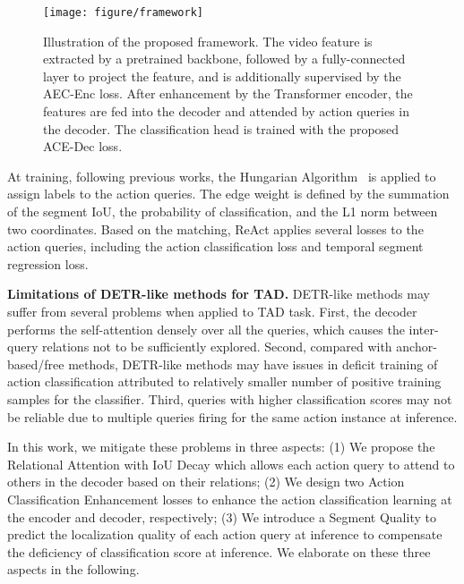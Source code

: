 \documentclass[runningheads]{llncs}
\newcommand{\myPara}[1]{\vspace{.05in}\noindent\textbf{#1}}
\def\name{ReAct }
\def\score{Segment Quality }
\begin{document}
\begin{figure}[t]
    \centering
    \setlength{\abovecaptionskip}{-0.2cm}
    \texttt{[image: figure/framework]}
    \label{framework}
    \caption{Illustration of the proposed framework. The video feature is extracted by a pretrained backbone, followed by a fully-connected layer to project the feature, and is additionally supervised by the AEC-Enc loss. After enhancement by the Transformer encoder, the features are fed into the decoder and attended by  action queries in the decoder. The classification head is trained with the proposed ACE-Dec loss.} 
    \vspace{-0.4cm}
\end{figure}




At training, following previous works\cite{carion2020end,zhu2020deformable,liu2021end}, the Hungarian Algorithm~\cite{kuhn1955hungarian} is applied to assign labels to the action queries. The edge weight is defined by the summation of the segment IoU, the probability of classification, and the L1 norm between two coordinates.
Based on the matching, \name applies several losses to the action queries, including the action classification loss and temporal segment regression loss. 







\myPara{Limitations of DETR-like methods for TAD.}
DETR-like methods may suffer from several problems when applied to TAD task. First, the decoder performs the self-attention densely over all the queries, which causes the inter-query relations not to be sufficiently explored. Second, compared with anchor-based/free methods, DETR-like methods may have issues in deficit training of action classification attributed to relatively smaller number of positive training samples for the classifier. Third, queries with higher classification scores may not be reliable due to multiple queries firing for the same action instance at inference. 

In this work, we mitigate these problems in three aspects: (1) We propose the Relational Attention with IoU Decay which allows each action query to attend to others in the decoder based on their relations; (2) We design two Action Classification Enhancement losses to enhance the action classification learning at the encoder and decoder, respectively; (3) We introduce a \score to predict the localization quality of each action query at inference to compensate the deficiency of classification score at inference. We elaborate on these three aspects in the following. 
\end{document}
